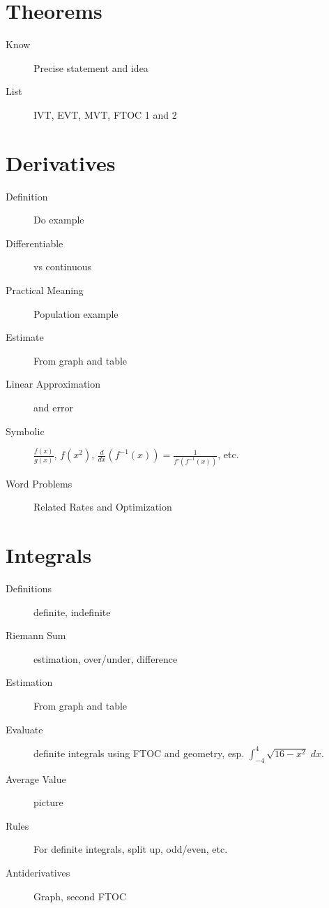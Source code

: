 \documentclass[11pt]{article}
\begin{document}
\drawtitle

\section*{Theorems}
\begin{description}
\item[Know] Precise statement and idea
\item[List] IVT, EVT, MVT, FTOC 1 and 2
\end{description}

\section*{Derivatives}
\begin{description}
\item[Definition] Do example
\item[Differentiable] vs continuous
\item[Practical Meaning] Population example
\item[Estimate] From graph and table
\item[Linear Approximation] and error
\item[Symbolic] $\frac{f(x)}{g(x)}$, $f(x^2)$,
  $\frac{d}{dx}\left(f^{-1}(x)\right) = \frac{1}{f'(f^{-1}(x))}$, etc.
\item[Word Problems] Related Rates and Optimization
\end{description}

\section*{Integrals}
\begin{description}
\item[Definitions] definite, indefinite
\item[Riemann Sum] estimation, over/under, difference
\item[Estimation] From graph and table
\item[Evaluate] definite integrals using FTOC and geometry,
  esp. $\int_{-4}^4 \sqrt{16 - x^2}\; dx$.
\item[Average Value] picture
\item[Rules] For definite integrals, split up, odd/even, etc.
\item[Antiderivatives] Graph, second FTOC
\end{description}
\end{document}
